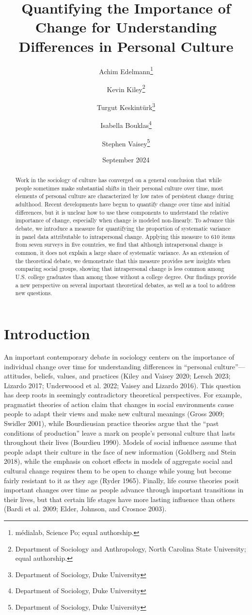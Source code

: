 \documentclass[
  11pt,
]{article}
\title{Quantifying the Importance of Change for Understanding\\
Differences in Personal Culture}
\author{Achim Edelmann\footnote{médialab, Science Po; equal authorship.} \and Kevin
Kiley\footnote{Department of Sociology and Anthropology, North Carolina
  State University; equal authorship.} \and Turgut
Keskintürk\footnote{Department of Sociology, Duke University} \and Isabella
Bouklas\footnote{Department of Sociology, Duke University} \and Stephen
Vaisey\footnote{Department of Sociology, Duke University}}
\date{September 2024}
\begin{document}
\maketitle
\begin{abstract}
Work in the sociology of culture has converged on a general conclusion
that while people sometimes make substantial shifts in their personal
culture over time, most elements of personal culture are characterized
by low rates of persistent change during adulthood. Recent developments
have begun to quantify change over time and initial differences, but it
is unclear how to use these components to understand the relative
importance of change, especially when change is modeled non-linearly. To
advance this debate, we introduce a measure for quantifying the
proportion of systematic variance in panel data attributable to
intrapersonal change. Applying this measure to 610 items from seven
surveys in five countries, we find that although intrapersonal change is
common, it does not explain a large share of systematic variance. As an
extension of the theoretical debate, we demonstrate that this measure
provides new insights when comparing social groups, showing that
intrapersonal change is less common among U.S. college graduates than
among those without a college degree. Our findings provide a new
perspective on several important theoretical debates, as well as a tool
to address new questions.
\end{abstract}

\section{Introduction}\label{introduction}

An important contemporary debate in sociology centers on the importance
of individual change over time for understanding differences in
``personal culture''---attitudes, beliefs, values, and practices (Kiley
and Vaisey 2020; Lersch 2023; Lizardo 2017; Underwoood et al. 2022;
Vaisey and Lizardo 2016). This question has deep roots in seemingly
contradictory theoretical perspectives. For example, pragmatist theories
of action claim that changes in social environments cause people to
adapt their views and make new cultural meanings (Gross 2009; Swidler
2001), while Bourdieusian practice theories argue that the ``past
conditions of production'' leave a mark on people's personal culture
that lasts throughout their lives (Bourdieu 1990). Models of social
influence assume that people adapt their culture in the face of new
information (Goldberg and Stein 2018), while the emphasis on cohort
effects in models of aggregate social and cultural change requires them
to be open to change while young but become fairly resistant to it as
they age (Ryder 1965). Finally, life course theories posit important
changes over time as people advance through important transitions in
their lives, but that certain life stages have more lasting influence
than others (Bardi et al. 2009; Elder, Johnson, and Crosnoe 2003).
\end{document}

